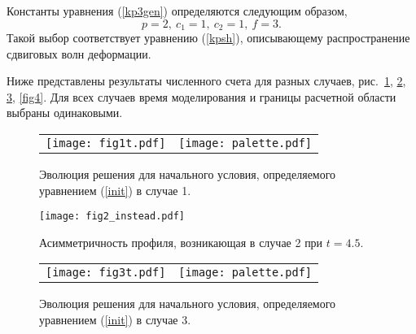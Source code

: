 Константы уравнения (\ref{kp3gen}) определяются следующим образом,
\[
p=2, ~c_1 = 1, ~c_2 = 1, ~f = 3.
\]
Такой выбор соответствует уравнению (\ref{kpsh}), описывающему распространение сдвиговых волн деформации. 

Ниже представлены результаты численного счета для разных случаев, рис.~\ref{fig1}, \ref{fig2}, \ref{fig3}, \ref{fig4}. Для всех случаев время моделирования и границы расчетной области выбраны одинаковыми.

\begin{figure}[h]
	\begin{center}
		\begin{tabular}{cc}
			\texttt{[image: fig1t.pdf]} & \texttt{[image: palette.pdf]}
		\end{tabular}
		\caption{Эволюция решения для начального условия, определяемого уравнением (\ref{init}) в случае 1.}\label{fig1}
	\end{center}
\end{figure}
\begin{figure}
	\begin{center}
		\texttt{[image: fig2\_instead.pdf]} 
		\caption{Асимметричность профиля, возникающая в случае 2 при $t = 4.5$.}\label{fig2}		
	\end{center}
\end{figure}
\begin{figure}
	\begin{center}
		\begin{tabular}{cc}
			\texttt{[image: fig3t.pdf]} & \texttt{[image: palette.pdf]}
		\end{tabular}
		\caption{Эволюция решения для начального условия, определяемого уравнением (\ref{init}) в случае 3.}\label{fig3}
	\end{center}
\end{figure}

